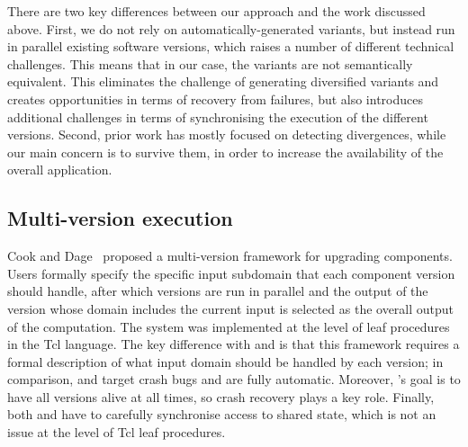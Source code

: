 
There are two key differences between our approach and the work discussed
above. First, we do not rely on automatically-generated variants, but instead
run in parallel existing software versions, which raises a number of different
technical challenges.  This means that in our case, the variants are not
semantically equivalent. This eliminates the challenge of generating
diversified variants and creates opportunities in terms of recovery from
failures, but also introduces additional challenges in terms of synchronising
the execution of the different versions.  Second, prior work has mostly focused
on detecting divergences, while our main concern is to survive them, in order
to increase the availability of the overall application.


\subsection{Multi-version execution}

Cook and Dage~\cite{cook:icse99} proposed a multi-version framework for
upgrading components. Users formally specify the specific input subdomain that
each component version should handle, after which versions are run in parallel
and the output of the version whose domain includes the current input is
selected as the overall output of the computation. The system was implemented
at the level of leaf procedures in the Tcl language. The key difference with
\mx and \varan is that this framework requires a formal description of what
input domain should be handled by each version; in comparison, \mx and \varan
target crash bugs and are fully automatic.  Moreover, \mx's goal is to have all
versions alive at all times, so crash recovery plays a key role.  Finally, both
\mx and \varan have to carefully synchronise access to shared state, which is
not an issue at the level of Tcl leaf procedures.

